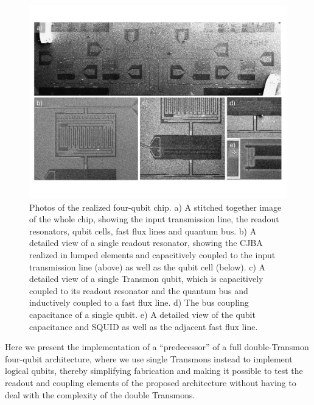 \begin{figure}[ht!]
	\centering
	\includegraphics[width=\textwidth]{./material/figures/scalable-architecture/scalable_architecture_photos}
	\caption[]{Photos of the realized four-qubit chip. a) A stitched together image of the whole chip, showing the input transmission line, the readout resonators, qubit cells, fast flux lines and quantum bus. b) A detailed view of a single readout resonator, showing the CJBA realized in lumped elements and capacitively coupled to the input transmission line (above) as well as the qubit cell (below). c) A detailed view of a single Transmon qubit, which is capacitively coupled to its readout resonator and the quantum bus and inductively coupled to a fast flux line. d) The bus coupling capacitance of a single qubit. e) A detailed view of the qubit capacitance and SQUID as well as the adjacent fast flux line.}
	\label{fig:scalable_architecture_photos}
\end{figure}

Here we present the implementation of a ``predecessor'' of a full double-Transmon four-qubit architecture, where we use single Transmons instead to implement logical qubits, thereby simplifying fabrication and making it possible to test the readout and coupling elements of the proposed architecture without having to deal with the complexity of the double Transmons.

\smallskip

